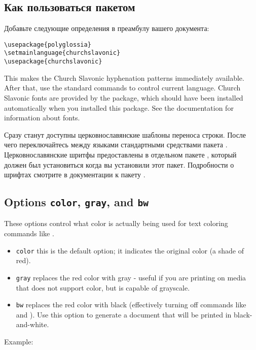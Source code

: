 \begin{RU}
\section{Как пользоваться пакетом}
Добавьте следующие определения в преамбулу вашего документа:
\end{RU}

\begin{verbatim}
\usepackage{polyglossia}
\setmainlanguage{churchslavonic} 
\usepackage{churchslavonic}
\end{verbatim}

\begin{EN}
This makes the Church Slavonic hyphenation patterns immediately available.
After that, use the standard  commands to control current language.
Church Slavonic fonts are provided by the  package,
which should have been installed automatically when you installed this package.
See the  documentation for information about fonts.
\end{EN}

\begin{RU}
Сразу станут доступны церковнославянские шаблоны переноса строки.
После чего переключайтесь между языками стандартными средствами пакета .
Церковнославянские шритфы предоставлены в отдельном пакете ,
который должен был установиться когда вы установили этот пакет.
Подробности о шрифтах смотрите в документации к пакету .
\end{RU}

\begin{EN}
\subsection{Options \texttt{color}, \texttt{gray}, and \texttt{bw}}
These options control what color is actually being used for text coloring commands like .

\begin{itemize}
\item \texttt{color} this is the default option; it indicates the original color (a shade of red).
\item \texttt{gray} replaces the red color with gray - useful if you are printing on media that
    does not support color, but is capable of grayscale.
\item \texttt{bw} replaces the red color with black (effectively turning off
commands like  and ). Use
    this option to generate a document that will be printed in black-and-white.
\end{itemize}
Example:
\end{EN}

